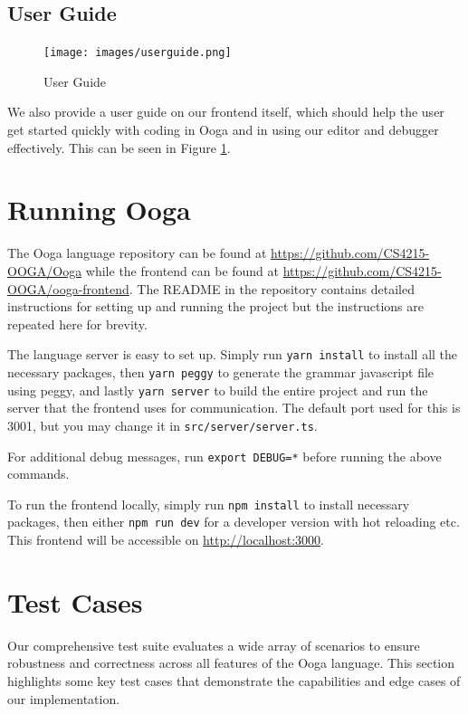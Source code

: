 \documentclass{report}
\begin{document}
\subsection{User Guide}

\begin{figure}
    \centering
    \texttt{[image: images/userguide.png]}
    \caption{User Guide}
    \label{fig:user-guide}
\end{figure}

We also provide a user guide on our frontend itself, which should help the user get started quickly with coding in Ooga and in using our editor and debugger effectively. This can be seen in Figure \ref{fig:user-guide}.

\section{Running Ooga}

The Ooga language repository can be found at \url{https://github.com/CS4215-OOGA/Ooga} while the frontend can be found at \url{https://github.com/CS4215-OOGA/ooga-frontend}. The README in the repository contains detailed instructions for setting up and running the project but the instructions are repeated here for brevity.

The language server is easy to set up. Simply run \texttt{yarn install} to install all the necessary packages, then \texttt{yarn peggy} to generate the grammar javascript file using peggy, and lastly \texttt{yarn server} to build the entire project and run the server that the frontend uses for communication. The default port used for this is 3001, but you may change it in \texttt{src/server/server.ts}.

For additional debug messages, run \texttt{export DEBUG=*} before running the above commands.

To run the frontend locally, simply run \texttt{npm install} to install necessary packages, then either \texttt{npm run dev} for a developer version with hot reloading etc. This frontend will be accessible on \url{http://localhost:3000}.

\section{Test Cases} \label{section:test-cases}
Our comprehensive test suite evaluates a wide array of scenarios to ensure robustness and correctness across all features of the Ooga language. This section highlights some key test cases that demonstrate the capabilities and edge cases of our implementation.
\end{document}
